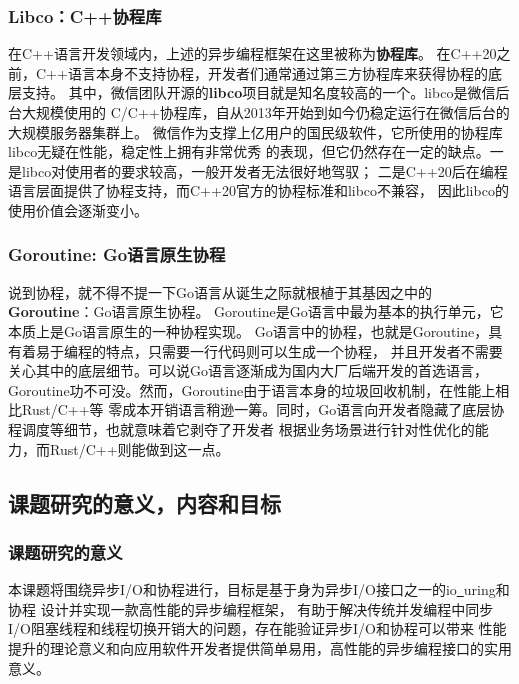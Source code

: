 \documentclass[supercite]{HustGraduPaper}
\theoremstyle{definition}
\begin{document}
\subsubsection{Libco：C++协程库}
在C++语言开发领域内，上述的异步编程框架在这里被称为\textbf{协程库}。
在C++20之前，C++语言本身不支持协程，开发者们通常通过第三方协程库来获得协程的底层支持。
其中，微信团队开源的\textbf{libco}项目就是知名度较高的一个。libco是微信后台大规模使用的
C/C++协程库，自从2013年开始到如今仍稳定运行在微信后台的大规模服务器集群上。
微信作为支撑上亿用户的国民级软件，它所使用的协程库libco无疑在性能，稳定性上拥有非常优秀
的表现，但它仍然存在一定的缺点。一是libco对使用者的要求较高，一般开发者无法很好地驾驭；
二是C++20后在编程语言层面提供了协程支持，而C++20官方的协程标准和libco不兼容，
因此libco的使用价值会逐渐变小。\par

\subsubsection{Goroutine: Go语言原生协程}
说到协程，就不得不提一下Go语言从诞生之际就根植于其基因之中的\textbf{Goroutine}：Go语言原生协程。
Goroutine是Go语言中最为基本的执行单元，它本质上是Go语言原生的一种协程实现。
Go语言中的协程，也就是Goroutine，具有着易于编程的特点，只需要一行代码则可以生成一个协程，
并且开发者不需要关心其中的底层细节。可以说Go语言逐渐成为国内大厂后端开发的首选语言，
Goroutine功不可没。然而，Goroutine由于语言本身的垃圾回收机制，在性能上相比Rust/C++等
零成本开销语言稍逊一筹。同时，Go语言向开发者隐藏了底层协程调度等细节，也就意味着它剥夺了开发者
根据业务场景进行针对性优化的能力，而Rust/C++则能做到这一点。\par

\subsection{课题研究的意义，内容和目标}

\subsubsection{课题研究的意义}
本课题将围绕异步I/O和协程进行，目标是基于身为异步I/O接口之一的io\underline{~}uring和协程
设计并实现一款高性能的异步编程框架，
有助于解决传统并发编程中同步I/O阻塞线程和线程切换开销大的问题，存在能验证异步I/O和协程可以带来
性能提升的理论意义和向应用软件开发者提供简单易用，高性能的异步编程接口的实用意义。\par
\end{document}
